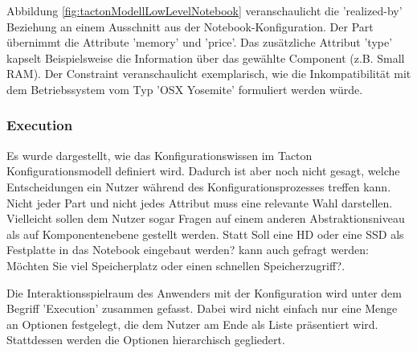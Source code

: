 \documentclass[12pt,a4paper,bibliography=totocnumbered,listof=totoc]{scrartcl}
\begin{document}
Abbildung \ref{fig:tactonModellLowLevelNotebook} veranschaulicht die 'realized-by' Beziehung an einem Ausschnitt aus der Notebook-Konfiguration.  Der Part übernimmt die Attribute 'memory' und 'price'. Das zusätzliche Attribut 'type' kapselt Beispielsweise die Information über das gewählte Component (z.B. Small RAM). Der Constraint veranschaulicht exemplarisch, wie die Inkompatibilität mit dem Betriebssystem vom Typ 'OSX Yosemite' formuliert werden würde.

\subsubsection{Execution}
\label{subsubsection:Execution}
Es wurde dargestellt, wie das Konfigurationswissen im Tacton Konfigurationsmodell definiert wird. Dadurch ist aber noch nicht gesagt, welche Entscheidungen ein Nutzer während des Konfigurationsprozesses treffen kann. Nicht jeder Part und nicht jedes Attribut muss eine relevante Wahl darstellen. Vielleicht sollen dem Nutzer sogar Fragen auf einem anderen Abstraktionsniveau als auf Komponentenebene gestellt werden. Statt \glqq Soll eine HD oder eine SSD als Festplatte in das Notebook eingebaut werden?\grqq{} kann auch gefragt werden: \glqq Möchten Sie viel Speicherplatz oder einen schnellen Speicherzugriff?\grqq.

Die Interaktionsspielraum des Anwenders mit der Konfiguration wird unter dem Begriff 'Execution' zusammen gefasst. Dabei wird nicht einfach nur eine Menge an Optionen festgelegt, die dem Nutzer am Ende als Liste präsentiert wird. Stattdessen werden die Optionen hierarchisch gegliedert.
\end{document}
